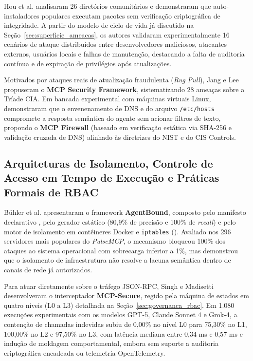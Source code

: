 Hou et al. \cite{hou2025mcp} analisaram 26 diretórios comunitários e demonstraram que auto-instaladores populares executam pacotes sem verificação criptográfica de integridade. A partir do modelo de ciclo de vida já discutido na Seção~\ref{sec:superficie_ameacas}, os autores validaram experimentalmente 16 cenários de ataque distribuídos entre desenvolvedores maliciosos, atacantes externos, usuários locais e falhas de manutenção, destacando a falta de auditoria contínua e de expiração de privilégios após atualizações.

Motivados por ataques reais de atualização fraudulenta (\textit{Rug Pull}), Jang e Lee \cite{jang2026hierarchical} propuseram o \textbf{MCP Security Framework}, sistematizando 28 ameaças sobre a Tríade CIA. Em bancada experimental com máquinas virtuais Linux, demonstraram que o envenenamento de DNS e do arquivo \texttt{/etc/hosts} compromete a resposta semântica do agente sem acionar filtros de texto, propondo o \textbf{MCP Firewall} (baseado em verificação estática via SHA-256 e validação cruzada de DNS) alinhado às diretrizes do NIST e do CIS Controls.

\subsection{Arquiteturas de Isolamento, Controle de Acesso em Tempo de Execução e Práticas Formais de RBAC}
\label{subsec:rel_rbac_isolamento}

Bühler et al. \cite{buhler2026agentbound} apresentaram o framework \textbf{AgentBound}, composto pelo manifesto declarativo , pelo gerador estático  (80,9\% de precisão e 100\% de \textit{recall}) e pelo motor de isolamento em contêineres Docker e \texttt{iptables} (). Avaliado nos 296 servidores mais populares do \textit{PulseMCP}, o mecanismo bloqueou 100\% dos ataques ao sistema operacional com sobrecarga inferior a 1\%, mas demonstrou que o isolamento de infraestrutura não resolve a lacuna semântica dentro de canais de rede já autorizados.

Para atuar diretamente sobre o tráfego JSON-RPC, Singh e Madisetti \cite{singh2026mcpsecure} desenvolveram o interceptador \textbf{MCP-Secure}, regido pela máquina de estados em quatro níveis (L0 a L3) detalhada na Seção~\ref{sec:governanca_rbac}. Em 1.080 execuções experimentais com os modelos GPT-5, Claude Sonnet 4 e Grok-4, a contenção de chamadas indevidas subiu de 0,00\% no nível L0 para 75,30\% no L1, 100,00\% no L2 e 97,50\% no L3, com latência mediana entre 0,34 ms e 0,57 ms e indução de moldagem comportamental, embora sem suporte a auditoria criptográfica encadeada ou telemetria OpenTelemetry.

